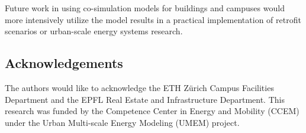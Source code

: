 \documentclass{tBPS2e}
\theoremstyle{plain}
\theoremstyle{definition}
\theoremstyle{remark}
\begin{document}
Future work in using co-simulation models for buildings and campuses would more intensively utilize the model results in a practical implementation of retrofit scenarios or urban-scale energy systems research. 

\subsection{Acknowledgements}

The authors would like to acknowledge the ETH Z\"urich Campus Facilities Department and the EPFL Real Estate and Infrastructure Department. This research was funded by the Competence Center in Energy and Mobility (CCEM) under the Urban Multi-scale Energy Modeling (UMEM) project.



\end{document}
